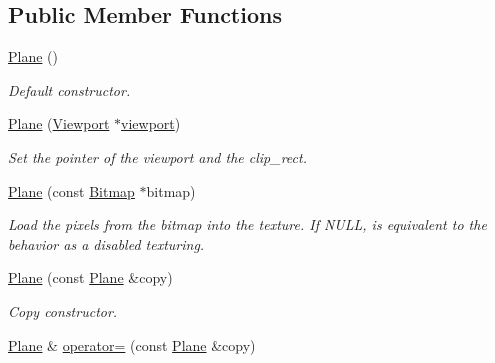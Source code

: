 \subsection*{Public Member Functions}
\begin{DoxyCompactItemize}
\item 
\hypertarget{class_f2_c_1_1_plane_ae964dce807d325a229b2b0483d04bac0}{
\hyperlink{class_f2_c_1_1_plane_ae964dce807d325a229b2b0483d04bac0}{Plane} ()}
\label{class_f2_c_1_1_plane_ae964dce807d325a229b2b0483d04bac0}

\begin{DoxyCompactList}\small\item\em Default constructor. \item\end{DoxyCompactList}\item 
\hyperlink{class_f2_c_1_1_plane_a257596b463548284ec5699e5290b4a9d}{Plane} (\hyperlink{class_f2_c_1_1_viewport}{Viewport} $\ast$\hyperlink{class_f2_c_1_1_plane_a755aaa0644174adc1574d04a1378c22f}{viewport})
\begin{DoxyCompactList}\small\item\em Set the pointer of the viewport and the clip\_\-rect. \item\end{DoxyCompactList}\item 
\hyperlink{class_f2_c_1_1_plane_a2d6c6add986f779ce1879a4ac4ad5458}{Plane} (const \hyperlink{class_f2_c_1_1_bitmap}{Bitmap} $\ast$bitmap)
\begin{DoxyCompactList}\small\item\em Load the pixels from the bitmap into the texture. If NULL, is equivalent to the behavior as a disabled texturing. \item\end{DoxyCompactList}\item 
\hypertarget{class_f2_c_1_1_plane_a6d692311afad34bbd0407ecffa8fda6e}{
\hyperlink{class_f2_c_1_1_plane_a6d692311afad34bbd0407ecffa8fda6e}{Plane} (const \hyperlink{class_f2_c_1_1_plane}{Plane} \&copy)}
\label{class_f2_c_1_1_plane_a6d692311afad34bbd0407ecffa8fda6e}

\begin{DoxyCompactList}\small\item\em Copy constructor. \item\end{DoxyCompactList}\item 
\hypertarget{class_f2_c_1_1_plane_afb63aaf92522d735b7614d2ccbda4e99}{
\hyperlink{class_f2_c_1_1_plane}{Plane} \& \hyperlink{class_f2_c_1_1_plane_afb63aaf92522d735b7614d2ccbda4e99}{operator=} (const \hyperlink{class_f2_c_1_1_plane}{Plane} \&copy)}
\label{class_f2_c_1_1_plane_afb63aaf92522d735b7614d2ccbda4e99}


\end{DoxyCompactItemize}
